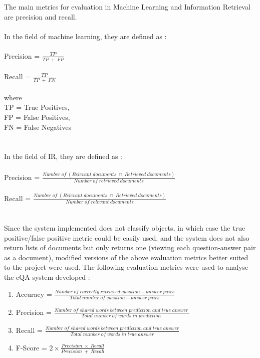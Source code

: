 \documentclass[12pt, a4paper]{article}
\begin{document}
The main metrics for evaluation in Machine Learning and Information Retrieval are precision and recall. 
\\~\\ 
In the field of machine learning, they are defined as : 
\\~\\ 
Precision = \(\frac{TP}{TP\; +\; FP}\) 
\\~\\ 
Recall = \(\frac{TP}{TP\; +\; FN}\) 
\\~\\ 
where \\ 
TP = True Positives, \\ 
FP = False Positives, \\ 
FN = False Negatives 
\\~\\~\\ 
In the field of IR, they are defined as \cite{precrec}: 
\\~\\
Precision = \(\frac{Number\; of\; (Relevant\; documents\; \cap\; Retrieved\; documents)}{Number\; of\; retrieved\; documents}\) 
\\~\\ 
Recall = \(\frac{Number\; of\; (Relevant\; documents\; \cap\; Retrieved\; documents)}{Number\; of\; relevant\; documents}\) 
\\~\\~\\ 
Since the system implemented does not classify objects, in which case the true positive/false positive metric could be easily used, and the system does not also return lists of documents but only returns one (viewing each question-answer pair as a document), modified versions of the above evaluation metrics better suited to the project were used. The following evaluation metrics \cite{evmets} were used to analyse the cQA system developed : 

\begin{enumerate}
    \item Accuracy = \(\frac{Number\; of\; correctly\; retrieved\; question-answer\; pairs}{Total\; number\; of\; question-answer\; pairs}\) 
    \item Precision = \(\frac{Number\; of\; shared\; words\; between\; prediction\; and\; true\; answer\;}{Total\; number\; of\; words\; in\; prediction\;}\) 
    \item Recall = \(\frac{Number\; of\; shared\; words\; between\; prediction\; and\; true\; answer}{Total\; number\; of\; words\; in\; true\; answer}\) 
    \item F-Score = \(2\times\frac{Precision\; \times \; Recall}{Precision\; +\; Recall}\)
\end{enumerate} 
\end{document}
